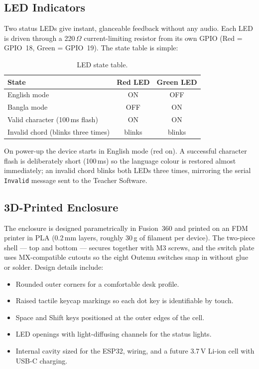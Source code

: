 \documentclass[11pt,a4paper,twoside]{article}
\begin{document}
\subsection{LED Indicators}
Two status LEDs give instant, glanceable feedback without any audio. Each
LED is driven through a 220\,$\Omega$ current-limiting resistor from its
own GPIO (Red = GPIO~18, Green = GPIO~19). The state table is simple:

\begin{table}[H]\centering
\caption{LED state table.}\label{tab:led-states}
\begin{tabular}{l c c}\toprule
\textbf{State} & \textbf{Red LED} & \textbf{Green LED} \\\midrule
English mode & ON & OFF \\
Bangla mode & OFF & ON \\
Valid character (100\,ms flash) & ON & ON \\
Invalid chord (blinks three times) & blinks & blinks \\\bottomrule
\end{tabular}\end{table}

On power-up the device starts in English mode (red on). A successful
character flash is deliberately short (100\,ms) so the language colour is
restored almost immediately; an invalid chord blinks both LEDs three
times, mirroring the serial \texttt{Invalid} message sent to the Teacher
Software.

\subsection{3D-Printed Enclosure}
The enclosure is designed parametrically in Fusion~360 and printed on an
FDM printer in PLA (0.2\,mm layers, roughly 30\,g of filament per device).
The two-piece shell --- top and bottom --- secures together with M3
screws, and the switch plate uses MX-compatible cutouts so the eight
Outemu switches snap in without glue or solder. Design details include:

\begin{itemize}[nosep]
  \item Rounded outer corners for a comfortable desk profile.
  \item Raised tactile keycap markings so each dot key is identifiable by touch.
  \item Space and Shift keys positioned at the outer edges of the cell.
  \item LED openings with light-diffusing channels for the status lights.
  \item Internal cavity sized for the ESP32, wiring, and a future
    3.7\,V Li-ion cell with USB-C charging.
\end{itemize}
\end{document}
